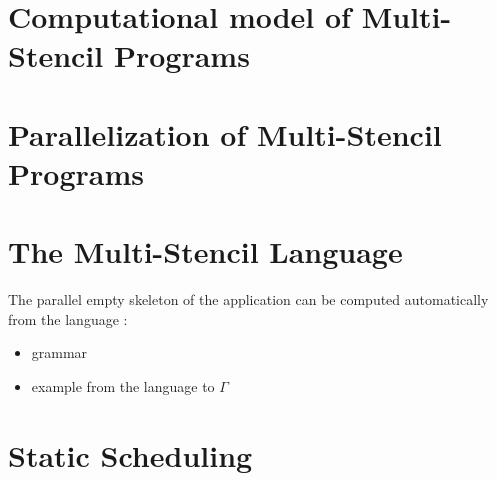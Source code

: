 \documentclass[twocolumn]{svjour3}          %
\begin{document}
\section{Computational model of Multi-Stencil Programs}
\label{sect:formalism}

\section{Parallelization of Multi-Stencil Programs}
\label{sect:parallelism}

\section{The Multi-Stencil Language}
\label{sect:msl}

The parallel empty skeleton of the application can be computed automatically from the language :
\begin{itemize}
\item grammar
\item example from the language to $\Gamma$
\end{itemize}
\section{Static Scheduling}
\label{sect:msp}

\end{document}
